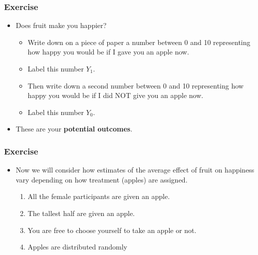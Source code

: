 \documentclass[xcolor=x11names,compress]{beamer}\usepackage[]{graphicx}\usepackage[]{color}
\renewcommand{\(}{\begin{columns}}
\renewcommand{\)}{\end{columns}}
\newcommand{\<}[1]{\begin{column}{#1}}
\renewcommand{\>}{\end{column}}
\begin{document}
\begin{frame}
\frametitle{Exercise}
\begin{itemize}
\item Does fruit make you happier? 
\pause
\begin{itemize}
\item Write down on a piece of paper a number between 0 and 10 representing how happy you would be if I gave you an apple now. 
\pause
\item Label this number $Y_1$.
\pause
\item Then write down a second number between 0 and 10 representing how happy you would be if I did NOT give you an apple now. 
\pause
\item Label this number $Y_0$.
\pause
\end{itemize}
\item These are your \textbf{potential outcomes}.
\end{itemize}
\end{frame}

\begin{frame}
\frametitle{Exercise}
\begin{itemize}
\item Now we will consider how estimates of the average effect of fruit on happiness vary depending on how treatment (apples) are assigned.
\pause
\begin{enumerate}
\item All the female participants are given an apple.
\pause
\item The tallest half are given an apple.
\pause
\item You are free to choose yourself to take an apple or not.
\pause
\item Apples are distributed randomly
\end{enumerate}
\end{itemize}
\end{frame}
\end{document}
